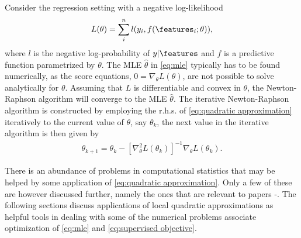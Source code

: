 \begin{Example}\label{ex:newton-raphson}
	Consider the regression setting with a negative log-likelihood 
	$$L(\theta)=\sum_i^n l(y_i,f(\features_i;\theta)),$$
	where $l$ is the negative log-probability of $y|\features$ and $f$ is a predictive function parametrized
	by $\theta$.
	The MLE $\hat{\theta}$ in \eqref{eq:mle} typically has to be found numerically, as 
	the score equations, $0=\nabla_\theta L(\theta)$, are not possible to solve 
	analytically for $\theta$. Assuming that $L$ is differentiable and convex in $\theta$, the Newton-Raphson algorithm will converge to the MLE $\hat{\theta}$. 
	The iterative Newton-Raphson algorithm is constructed by employing the r.h.s. of \eqref{eq:quadratic approximation} iteratively to the current value of $\theta$, say $\theta_k$, the next value in the iterative algorithm is then given by 
	\begin{align*}
		\theta_{k+1} = \theta_k 
		- \left[\nabla_\theta^2 L(\theta_k)\right]^{-1}
		\nabla_\theta L(\theta_k).
	\end{align*}
\end{Example}

There is an abundance of problems in computational statistics that may be helped by
some application of \eqref{eq:quadratic approximation}. Only a few of these are however discussed further, namely the ones that are relevant to papers -.
The following sections discuss applications of local quadratic approximations as helpful tools in dealing with some of the numerical problems associate optimization of \eqref{eq:mle} and \eqref{eq:supervised objective}.



